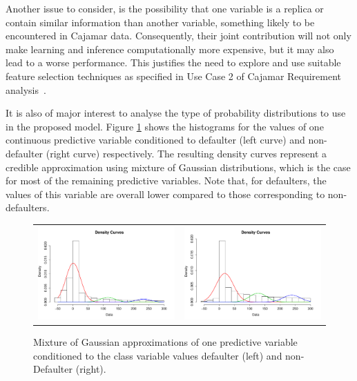 Another issue to consider, is the possibility that one variable is a replica or contain similar information than another variable, something likely to be encountered in Cajamar data. Consequently, their joint contribution will not only make learning and inference computationally more expensive, but it may also lead to a worse performance. This justifies the need to explore and use suitable feature selection techniques as specified in Use Case 2 of Cajamar Requirement analysis~\cite{Fer14b}.

It is also of major interest to analyse the type of probability distributions to use in the proposed model. Figure \ref{Figure:cajamarMixt} shows the histograms for the values of one continuous predictive variable conditioned to defaulter (left curve) and non-defaulter (right curve) respectively. The resulting density curves represent a credible approximation using mixture of Gaussian distributions, which is the case for most of the remaining predictive variables. Note that, for defaulters, the values of this variable are overall lower compared to those corresponding to non-defaulters.

\begin{figure}[ht!]
  \centering
    \begin{tabular}{cc}
    \includegraphics[width=70mm]{figures/CajaMarmixtureBalanceDef}&
    \includegraphics[width=70mm]{figures/CajaMarmixtureBalanceNonDef}\\
  \end{tabular}
    \caption{\label{Figure:cajamarMixt}Mixture of Gaussian approximations of one predictive variable conditioned to the class variable values defaulter (left) and non-Defaulter (right).}
\end{figure}

